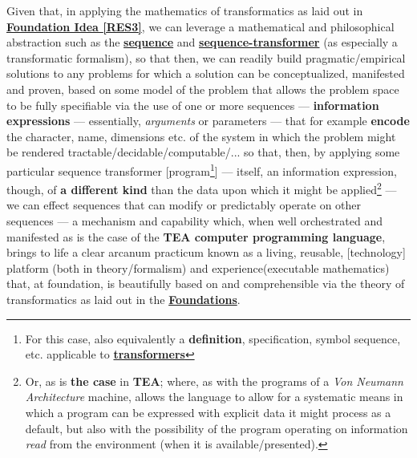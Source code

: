 \documentclass[12pt,a4paper]{article}
\begin{document}
Given that, in applying the mathematics of transformatics as laid out in \textbf{\hyperref[RES3]{Foundation Idea \ref{RES3}}}, we can leverage a mathematical and philosophical abstraction such as the \textbf{\hyperref[RES3]{sequence}} and \textbf{\hyperref[RES7]{sequence-transformer}} (as especially a transformatic formalism), so that then, we can readily build pragmatic/empirical solutions to any problems for which a solution can be conceptualized, manifested and proven, based on some model of the problem that allows the problem space to be fully specifiable via the use of one or more sequences --- \textbf{information expressions}\cite{lnspaper} --- essentially, \textit{arguments} or parameters --- that for example \textbf{encode} the character, name, dimensions etc. of the system in which the problem might be rendered tractable/decidable/computable/... so that, then, by applying some particular sequence transformer [program\footnote{For this case, also equivalently a \textbf{definition}, specification, symbol sequence, etc. applicable to \textbf{\hyperref[RES7]{transformers}}}] --- itself, an information expression, though, of \textbf{a different kind} than the data upon which it might be applied\footnote{Or, as is \textbf{the case} in \textbf{TEA}; where, as with the programs of a \textit{Von Neumann Architecture} machine, allows the language to allow for a systematic means in which a program can be expressed with explicit data it might process as a default, but also with the possibility of the program operating on information \textit{read} from the environment (when it is available/presented).} --- we can effect sequences that can modify or predictably operate on other sequences --- a mechanism and capability which, when well orchestrated and manifested as is the case of the \textbf{TEA computer programming language}\cite{Lutalo2024TEATAZ}, brings to life a clear arcanum practicum known as a living, reusable, [technology] platform (both in theory/formalism) and experience(executable mathematics) that, at foundation, is beautifully based on and comprehensible via the theory of transformatics as laid out in the \textbf{\hyperref[SECFOUND]{Foundations}}.



\end{document}
